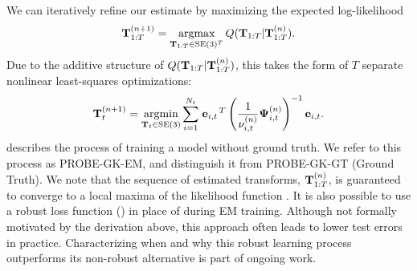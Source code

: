 We can iteratively refine our estimate by maximizing the expected
log-likelihood
\begin{equation}
  \boldsymbol{\mathbf{T}}_{1:T}^{(n+1)} = 
    \operatorname*{argmax}_{\boldsymbol{\mathbf{T}}_{1:T}\in\text{SE}(3)^T}
    Q(\boldsymbol{\mathbf{T}}_{1:T} \vert \boldsymbol{\mathbf{T}}_{1:T}^{(n)}).
\end{equation}
Due to the additive structure of $Q(\boldsymbol{\mathbf{T}}_{1:T} \vert
\boldsymbol{\mathbf{T}}_{1:T}^{(n)})$, this takes the form of $T$ separate nonlinear least-squares optimizations:  
\begin{equation}
\label{eq:Qargmin}
  \boldsymbol{\mathbf{T}}_{t}^{(n+1)} = 
    \operatorname*{argmin}_{\boldsymbol{\mathbf{T}}_{t}\in\text{SE}(3)}
  \sum_{i=1}^{N_t} \left.{\boldsymbol{\mathbf{e}}_{i,t}}\right.^T
  \left(\frac{1}{\nu_{i,t}^{(n)}}\boldsymbol{\mathbf{\Psi}}_{i,t}^{(n)}\right)^{-1}
  \boldsymbol{\mathbf{e}}_{i,t}.
\end{equation}
  describes the process of training a model without
ground truth. We refer to this process as PROBE-GK-EM, and distinguish it from
PROBE-GK-GT (Ground Truth). We note that the sequence of estimated transforms,
$\boldsymbol{\mathbf{T}}_{1:T}^{(n)}$, is guaranteed to converge to a local maxima of the
likelihood function \citep{dempster1977maximum}. It is also possible to use a robust loss function () in place of  during EM training. Although not formally motivated by the derivation  above, this approach often leads to lower test errors in practice. Characterizing when and why this robust learning process outperforms its non-robust alternative is part of ongoing work.


